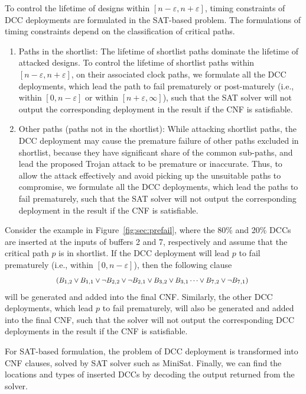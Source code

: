 To control the lifetime of designs within $[n - \varepsilon, n + \varepsilon]$, timing constraints of DCC deployments are formulated in the SAT-based problem. The formulations of timing constraints depend on the classification of critical paths.
\begin{enumerate}[leftmargin=*]
	\item Paths in the shortlist: The lifetime of shortlist paths dominate the lifetime of attacked designs. To control the lifetime of shortlist paths within $[n - \varepsilon, n + \varepsilon]$, on their associated clock paths, we formulate all the DCC deployments, which lead the path to fail prematurely or post-maturely (i.e., within $[ 0, n - \varepsilon]$ or within $[ n + \varepsilon, \infty]$), such that the SAT solver will not output the corresponding deployment in the result if the CNF is satisfiable.
	\item Other paths (paths not in the shortlist): While attacking shortlist paths, the DCC deployment may cause the premature failure of other paths excluded in shortlist, because they have significant share of the common sub-paths, and lead the proposed Trojan attack to be premature or inaccurate. Thus, to allow the attack effectively and avoid picking up the unsuitable paths to compromise, we formulate all the DCC deployments, which lead the paths to fail prematurely, such that the SAT solver will not output the corresponding deployment in the result if the CNF is satisfiable.  
\end{enumerate}

Consider the example in Figure~\ref{fig:sec:prefail}, where the 80\% and 20\% DCCs are inserted at the inputs of buffers 2 and 7, respectively and assume that the critical path $p$ is in shortlist. If the DCC deployment will lead $p$ to fail prematurely (i.e., within $[ 0, n - \varepsilon]$), then the following clause
\begin{gather*}
	\fontsize{8}{8} \selectfont
	\mbox{($B_{1,2} \lor B_{1,1} \lor \neg B_{2,2} \lor \neg B_{2,1}  \lor B_{3,2} \lor B_{3,1} \dots \lor B_{7,2} \lor \neg B_{7,1}$) } 
\end{gather*}
will be generated and added into the final CNF. Similarly, the other DCC deployments, which lead $p$ to fail prematurely, will also be generated and added into the final CNF, such that the solver will not output the corresponding DCC deployments in the result if the CNF is satisfiable. 

For SAT-based formulation, the problem of DCC deployment is transformed into CNF clauses, solved by SAT solver such as MiniSat. Finally, we can find the locations and types of inserted DCCs by decoding the output returned from the solver.



